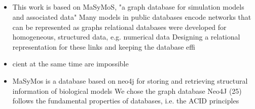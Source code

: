 	\subsection{\masymos}
	\begin{itemize}
	\item This work is based on MaSyMoS, "a graph database for simulation models and associated data" \cite{Henkel2015}
		\subitem \cite{Henkel2015} Many models in public databases encode networks that can be represented as graphs
		\subitem \cite{Henkel2015} relational databases were developed for homogeneous, structured data, e.g. numerical data
		\subitem \cite{Henkel2015} Designing a relational representation for these links and keeping the database effi\item cient at the same time are impossible
	
	\item \cite{Henkel2015} MaSyMos is a database based on neo4j for storing and retrieving structural information of biological models
		\subitem \cite{Henkel2015} We chose the graph database Neo4J (25)
		\subitem \cite{Henkel2015} follows the fundamental properties of databases, i.e. the ACID principles
		

\end{itemize}
